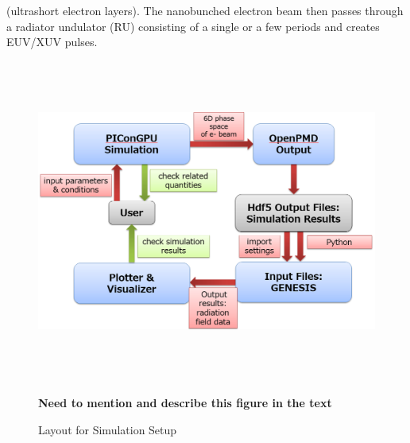 (ultrashort electron layers). The nanobunched electron beam then passes through
a radiator undulator (RU) consisting of a single or a few periods and creates
EUV/XUV pulses.
%
\begin{figure}[ht]
  \includegraphics[width=5.9425in,height=4.1882in]{figures/lwfafel-img002.png}
  \caption{Layout for Simulation Setup}
  \label{fig:lwfa-simulation_loop}
\textbf{Need to mention and describe this figure in the text}
\end{figure}
%
